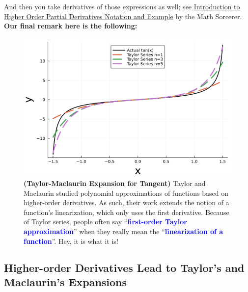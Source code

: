 And then you take derivatives of those expressions as well; see \href{https://youtu.be/BUIleGfqAeo}{Introduction to Higher Order Partial Derivatives Notation and Example} by the Math Sorcerer. \textbf{Our final remark here is the following:}

\begin{center}
\setlength{\fboxrule}{2pt}  %
\end{center}


 \begin{figure}[ht]%
\centering
\includegraphics[width=0.6\columnwidth]{graphics/Chap05/TaylorSeriesTangent.png}%
    \caption[]{\textbf{(Taylor-Maclaurin Expansion for Tangent)} Taylor and Maclaurin studied polynomial approximations of functions based on higher-order derivatives. As such, their work extends the notion of a function's linearization, which only uses the first derivative. Because of Taylor series, people often say ``\textcolor{blue}{\bf first-order Taylor approximation}'' when they really mean the ``\textcolor{blue}{\bf linearization of a function}''. Hey, it is what it is!}
    \label{fig:TaylorSeriesTangent}
\end{figure}

 \subsection{Higher-order Derivatives Lead to Taylor's and Maclaurin's Expansions}

